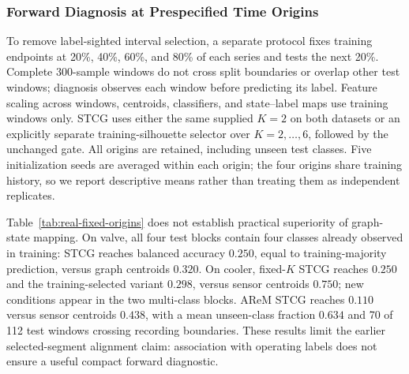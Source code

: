 \documentclass[sigconf,anonymous]{acmart}
\begin{document}
\subsubsection{Forward Diagnosis at Prespecified Time Origins}
\label{sec:real-fixed-origins}

To remove label-sighted interval selection, a separate protocol fixes training endpoints at 20\%, 40\%, 60\%, and 80\% of each series and tests the next 20\%.
Complete 300-sample windows do not cross split boundaries or overlap other test windows; diagnosis observes each window before predicting its label.
Feature scaling across windows, centroids, classifiers, and state--label maps use training windows only.
STCG uses either the same supplied $K{=}2$ on both datasets or an explicitly separate training-silhouette selector over $K=2,\ldots,6$, followed by the unchanged gate.
All origins are retained, including unseen test classes. Five initialization seeds are averaged within each origin; the four origins share training history, so we report descriptive means rather than treating them as independent replicates.

\begin{table}[t]
\caption{Forward balanced accuracy, averaged over four prespecified time origins. Cooler has two multi-class test blocks; valve and AReM have four. AReM follows archival recording order, with unseen activities and recording-crossing windows, rather than a natural online stream.}
\label{tab:real-fixed-origins}
\centering
\small

\end{table}

Table~\ref{tab:real-fixed-origins} does not establish practical superiority of graph-state mapping.
On valve, all four test blocks contain four classes already observed in training: STCG reaches balanced accuracy $0.250$, equal to training-majority prediction, versus graph centroids $0.320$.
On cooler, fixed-$K$ STCG reaches $0.250$ and the training-selected variant $0.298$, versus sensor centroids $0.750$; new conditions appear in the two multi-class blocks.
AReM STCG reaches $0.110$ versus sensor centroids $0.438$, with a mean unseen-class fraction $0.634$ and 70 of 112 test windows crossing recording boundaries.
These results limit the earlier selected-segment alignment claim: association with operating labels does not ensure a useful compact forward diagnostic.
\end{document}
